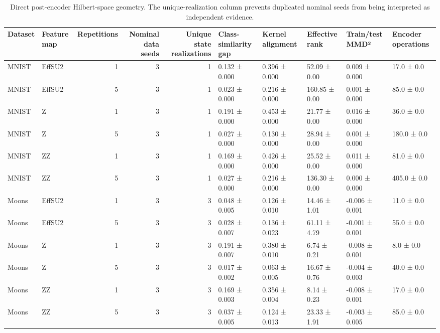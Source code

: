 \begin{table}[t]
\caption{Direct post-encoder Hilbert-space geometry. The unique-realization column prevents duplicated nominal seeds from being interpreted as independent evidence.}
\label{tab:geometry-cells}
\begin{tabular}{llrrrlllll}
\toprule
Dataset & Feature map & Repetitions & Nominal data seeds & Unique state realizations & Class-similarity gap & Kernel alignment & Effective rank & Train/test MMD² & Encoder operations \\
\midrule
MNIST & EffSU2 & 1 & 3 & 1 & 0.132 ± 0.000 & 0.396 ± 0.000 & 52.09 ± 0.00 & 0.009 ± 0.000 & 17.0 ± 0.0 \\
MNIST & EffSU2 & 5 & 3 & 1 & 0.023 ± 0.000 & 0.216 ± 0.000 & 160.85 ± 0.00 & 0.001 ± 0.000 & 85.0 ± 0.0 \\
MNIST & Z & 1 & 3 & 1 & 0.191 ± 0.000 & 0.453 ± 0.000 & 21.77 ± 0.00 & 0.016 ± 0.000 & 36.0 ± 0.0 \\
MNIST & Z & 5 & 3 & 1 & 0.027 ± 0.000 & 0.130 ± 0.000 & 28.94 ± 0.00 & 0.001 ± 0.000 & 180.0 ± 0.0 \\
MNIST & ZZ & 1 & 3 & 1 & 0.169 ± 0.000 & 0.426 ± 0.000 & 25.52 ± 0.00 & 0.011 ± 0.000 & 81.0 ± 0.0 \\
MNIST & ZZ & 5 & 3 & 1 & 0.027 ± 0.000 & 0.216 ± 0.000 & 136.30 ± 0.00 & 0.000 ± 0.000 & 405.0 ± 0.0 \\
Moons & EffSU2 & 1 & 3 & 3 & 0.048 ± 0.005 & 0.126 ± 0.010 & 14.46 ± 1.01 & -0.006 ± 0.001 & 11.0 ± 0.0 \\
Moons & EffSU2 & 5 & 3 & 3 & 0.028 ± 0.007 & 0.136 ± 0.023 & 61.11 ± 4.79 & -0.001 ± 0.001 & 55.0 ± 0.0 \\
Moons & Z & 1 & 3 & 3 & 0.191 ± 0.007 & 0.380 ± 0.010 & 6.74 ± 0.21 & -0.008 ± 0.001 & 8.0 ± 0.0 \\
Moons & Z & 5 & 3 & 3 & 0.017 ± 0.002 & 0.063 ± 0.005 & 16.67 ± 0.76 & -0.004 ± 0.003 & 40.0 ± 0.0 \\
Moons & ZZ & 1 & 3 & 3 & 0.169 ± 0.003 & 0.356 ± 0.004 & 8.14 ± 0.23 & -0.008 ± 0.001 & 17.0 ± 0.0 \\
Moons & ZZ & 5 & 3 & 3 & 0.037 ± 0.005 & 0.124 ± 0.013 & 23.33 ± 1.91 & -0.003 ± 0.005 & 85.0 ± 0.0 \\
\bottomrule
\end{tabular}
\end{table}
